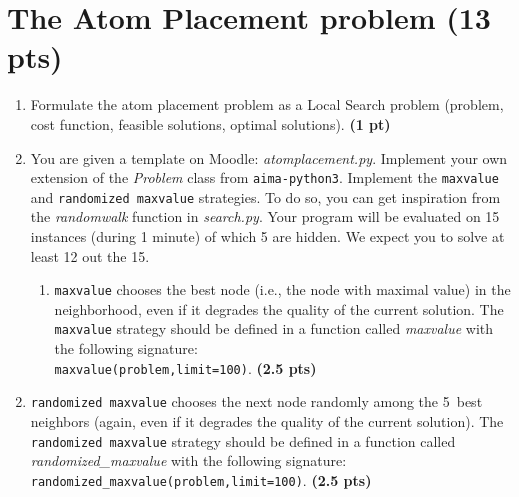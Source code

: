 \documentclass[11pt,a4paper]{report}
\begin{document}
\maketitle

\section{The Atom Placement problem (13 pts)}

\begin{enumerate}
\item Formulate the atom placement problem as a Local Search problem (problem, cost function, feasible solutions, optimal solutions). \textbf{(1 pt)}
\end{enumerate}

\begin{answers}[6cm]
\end{answers}


\begin{enumerate}
\setcounter{enumi}{1}
    \item You are given a template on Moodle: \textit{atomplacement.py}. Implement your own extension of the \textit{Problem} class from \texttt{aima-python3}. Implement the \texttt{maxvalue} and \texttt{randomized maxvalue} strategies. To do so,
	you can get inspiration from the \textit{randomwalk} function in \textit{search.py}. Your program will be evaluated on 15 instances (during 1 minute) of which 5 are hidden. We expect you to solve at least 12 out the 15.
    \begin{enumerate}
        \item \texttt{maxvalue} chooses the best node (i.e., the node with maximal
        value) in the neighborhood, even if it degrades the quality of the current solution. 
        The \texttt{maxvalue} strategy should be defined in a function called
        \textit{maxvalue} with the following signature: \\
        \texttt{maxvalue(problem,limit=100)}. \textbf{(2.5 pts)}
    \end{enumerate}
\end{enumerate}

\begin{answers}[2.5 cm]
\end{answers}



\begin{enumerate}
\setcounter{enumi}{1}
\begin{enumerate}
\setcounter{enumii}{1}
    \item \texttt{randomized maxvalue} chooses the next node randomly among
        the 5~best neighbors (again, even if it degrades the quality of the current solution).
        The \texttt{randomized maxvalue} strategy should be defined in a function called
        \textit{randomized\_maxvalue} with the following signature: \\
        \texttt{randomized\_maxvalue(problem,limit=100)}. \textbf{(2.5 pts)}
\end{enumerate}
\end{enumerate}
\end{document}
